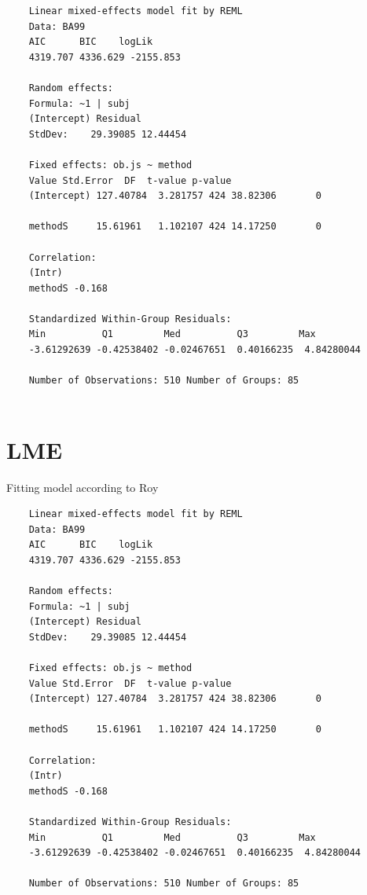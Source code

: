 \documentclass[12pt, a4paper]{report}
\theoremstyle{plain}
\theoremstyle{definition}
\theoremstyle{remark}
\begin{document}
	\newpage
	\begin{verbatim}
	Linear mixed-effects model fit by REML
	Data: BA99
	AIC      BIC    logLik
	4319.707 4336.629 -2155.853
	
	Random effects:
	Formula: ~1 | subj
	(Intercept) Residual
	StdDev:    29.39085 12.44454
	
	Fixed effects: ob.js ~ method
	Value Std.Error  DF  t-value p-value
	(Intercept) 127.40784  3.281757 424 38.82306       0
	
	methodS     15.61961   1.102107 424 14.17250       0
	
	Correlation:
	(Intr)
	methodS -0.168
	
	Standardized Within-Group Residuals:
	Min          Q1         Med          Q3         Max
	-3.61292639 -0.42538402 -0.02467651  0.40166235  4.84280044
	
	Number of Observations: 510 Number of Groups: 85
	
	\end{verbatim}
	
	\newpage

	\section{LME}
	
	Fitting model according to Roy
	
	\newpage
	\begin{verbatim}
	Linear mixed-effects model fit by REML
	Data: BA99
	AIC      BIC    logLik
	4319.707 4336.629 -2155.853
	
	Random effects:
	Formula: ~1 | subj
	(Intercept) Residual
	StdDev:    29.39085 12.44454
	
	Fixed effects: ob.js ~ method
	Value Std.Error  DF  t-value p-value
	(Intercept) 127.40784  3.281757 424 38.82306       0
	
	methodS     15.61961   1.102107 424 14.17250       0
	
	Correlation:
	(Intr)
	methodS -0.168
	
	Standardized Within-Group Residuals:
	Min          Q1         Med          Q3         Max
	-3.61292639 -0.42538402 -0.02467651  0.40166235  4.84280044
	
	Number of Observations: 510 Number of Groups: 85
	
	\end{verbatim}
	
	\newpage
	
\end{document}
